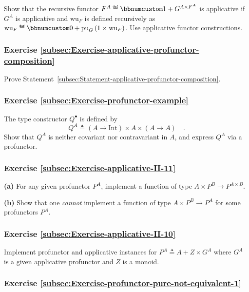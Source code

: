Show that the recursive functor $F^{A}\triangleq\bbnum 1+G^{A\times F^{A}}$
is applicative if $G^{A}$ is applicative and $\text{wu}_{F}$ is
defined recursively as $\text{wu}_{F}\triangleq\bbnum 0+\text{pu}_{G}\left(1\times\text{wu}_{F}\right)$.
Use applicative functor constructions.

\subsubsection{Exercise \label{subsec:Exercise-applicative-profunctor-composition}\ref{subsec:Exercise-applicative-profunctor-composition}}

Prove Statement~\ref{subsec:Statement-applicative-profunctor-composition}.

\subsubsection{Exercise \label{subsec:Exercise-profunctor-example}\ref{subsec:Exercise-profunctor-example}}

The type constructor $Q^{\bullet}$ is defined by 
\[
Q^{A}\triangleq\left(A\rightarrow\text{Int}\right)\times A\times\left(A\rightarrow A\right)\quad.
\]
Show that $Q^{A}$ is neither covariant nor contravariant in $A$,
and express $Q^{A}$ via a profunctor.

\subsubsection{Exercise \label{subsec:Exercise-applicative-II-11}\ref{subsec:Exercise-applicative-II-11}}

\textbf{(a)} For any given profunctor $P^{A}$, implement a function
of type $A\times P^{B}\rightarrow P^{A\times B}$. 

\textbf{(b)} Show that one \emph{cannot} implement a function of type
$A\times P^{B}\rightarrow P^{A}$ for some profunctors $P^{A}$.

\subsubsection{Exercise \label{subsec:Exercise-applicative-II-10}\ref{subsec:Exercise-applicative-II-10}}

Implement profunctor and applicative instances for $P^{A}\triangleq A+Z\times G^{A}$
where $G^{A}$ is a given applicative profunctor and $Z$ is a monoid.

\subsubsection{Exercise \label{subsec:Exercise-profunctor-pure-not-equivalent-1}\ref{subsec:Exercise-profunctor-pure-not-equivalent-1}}


